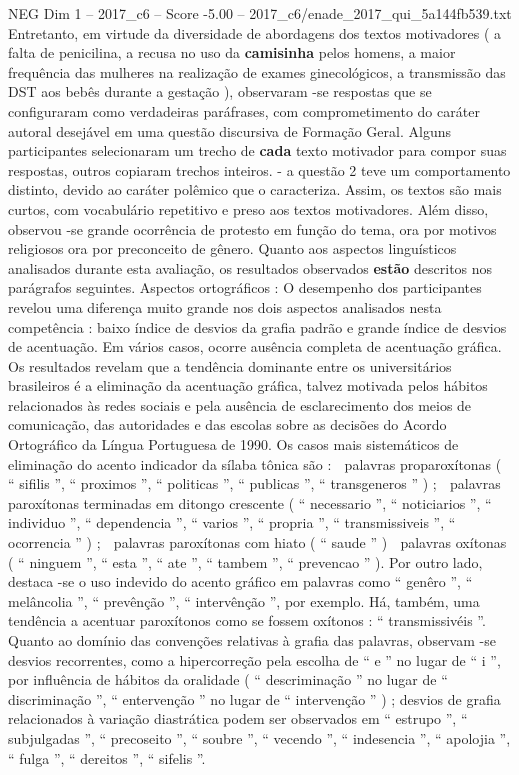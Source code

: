 \begin{textsample}{NEG Dim 1 – 2017\_c6 – Score -5.00 – 2017\_c6/enade\_2017\_qui\_5a144fb539.txt}
Entretanto, em virtude da diversidade de abordagens dos textos motivadores ( a falta de penicilina, a recusa no uso da \textbf{camisinha} pelos homens, a maior frequência das mulheres na realização de exames ginecológicos, a transmissão das DST aos bebês durante a gestação ), observaram -se respostas que se configuraram como verdadeiras paráfrases, com comprometimento do caráter autoral desejável em uma questão discursiva de Formação Geral.
Alguns participantes selecionaram um trecho de \textbf{cada} texto motivador para compor suas respostas, outros copiaram trechos inteiros. - a questão 2 teve um comportamento distinto, devido ao caráter polêmico que o caracteriza.
Assim, os textos são mais curtos, com vocabulário repetitivo e preso aos textos motivadores.
Além disso, observou -se grande ocorrência de protesto em função do tema, ora por motivos religiosos ora por preconceito de gênero.
Quanto aos aspectos linguísticos analisados durante esta avaliação, os resultados observados \textbf{estão} descritos nos parágrafos seguintes.
Aspectos ortográficos : O desempenho dos participantes revelou uma diferença muito grande nos dois aspectos analisados nesta competência : baixo índice de desvios da grafia padrão e grande índice de desvios de acentuação.
Em vários casos, ocorre ausência completa de acentuação gráfica.
Os resultados revelam que a tendência dominante entre os universitários brasileiros é a eliminação da acentuação gráfica, talvez motivada pelos hábitos relacionados às redes sociais e pela ausência de esclarecimento dos meios de comunicação, das autoridades e das escolas sobre as decisões do Acordo Ortográfico da Língua Portuguesa de 1990.
Os casos mais sistemáticos de eliminação do acento indicador da sílaba tônica são :  palavras proparoxítonas ( “ sifilis ”, “ proximos ”, “ politicas ”, “ publicas ”, “ transgeneros ” ) ;  palavras paroxítonas terminadas em ditongo crescente ( “ necessario ”, “ noticiarios ”, “ individuo ”, “ dependencia ”, “ varios ”, “ propria ”, “ transmissiveis ”, “ ocorrencia ” ) ;  palavras paroxítonas com hiato ( “ saude ” )  palavras oxítonas ( “ ninguem ”, “ esta ”, “ ate ”, “ tambem ”, “ prevencao ” ).
Por outro lado, destaca -se o uso indevido do acento gráfico em palavras como “ genêro ”, “ melâncolia ”, “ prevênção ”, “ intervênção ”, por exemplo.
Há, também, uma tendência a acentuar paroxítonos como se fossem oxítonos : “ transmissivéis ”.
Quanto ao domínio das convenções relativas à grafia das palavras, observam -se desvios recorrentes, como a hipercorreção pela escolha de “ e ” no lugar de “ i ”, por influência de hábitos da oralidade ( “ descriminação ” no lugar de “ discriminação ”, “ entervenção ” no lugar de “ intervenção ” ) ; desvios de grafia relacionados à variação diastrática podem ser observados em “ estrupo ”, “ subjulgadas ”, “ precoseito ”, “ soubre ”, “ vecendo ”, “ indesencia ”, “ apolojia ”, “ fulga ”, “ dereitos ”, “ sifelis ”.

\end{textsample}
